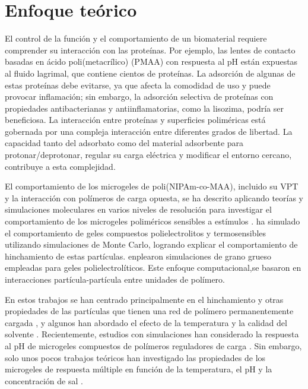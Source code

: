 \section{Enfoque te\'orico}


El control de la funci\'on y el comportamiento de un biomaterial requiere comprender su interacci\'on con las prote\'inas. Por ejemplo, las lentes de contacto basadas en \'acido poli(metacr\'ilico) (PMAA) con respuesta al pH est\'an expuestas al fluido lagrimal, que contiene cientos de prote\'inas. La adsorci\'on de algunas de estas prote\'inas debe evitarse, ya que afecta la comodidad de uso y puede provocar inflamaci\'on; sin embargo, la adsorci\'on selectiva de prote\'inas con propiedades antibacterianas y antiinflamatorias, como la lisozima, podr\'ia ser beneficiosa. 
La interacci\'on entre prote\'inas y superficies polim\'ericas est\'a gobernada por una compleja interacci\'on entre diferentes grados de libertad. La capacidad tanto del adsorbato como del material adsorbente para protonar/deprotonar, regular su carga el\'ectrica y modificar el entorno cercano, contribuye a esta complejidad.


El comportamiento de los microgeles de poli(NIPAm-co-MAA), incluido su VPT y la interacci\'on con pol\'imeros de carga opuesta, se ha descrito aplicando teor\'ias  y simulaciones moleculares en varios niveles de resoluci\'on para investigar el comportamiento de los microgeles polim\'ericos sensibles a est\'imulos \cite{ahualli2016coarse,Landsgesell2019SM}.
\citet{quesada2011gel} ha simulado el comportamiento de geles compuestos  polielectrolitos y termosensibles utilizando  simulaciones de Monte Carlo, logrando explicar el comportamiento de hinchamiento de estas part\'iculas.
\citet{ahualli2016coarse}
enplearon simulaciones de grano grueso empleadas para geles polielectrol\'iticos. Este enfoque computacional,se basaron en interacciones part\'icula-partícula entre unidades de pol\'imero. 

En estos trabajos se han centrado principalmente en el hinchamiento y otras propiedades de las part\'iculas que tienen una red de pol\'imero permanentemente cargada , y algunos han abordado el efecto de la temperatura y la calidad del solvente \cite{Jha2011, QuesadaPerez2013, moncho-jorda2016a, ahualli2016coarse, AdroherBenitez2017PCCP}.
Recientemente, estudios  con simulaciones han considerado la respuesta al pH de microgeles compuestos de pol\'imeros reguladores de carga \cite{Schroeder2015,Rud2017,Sean2018, Hofzumahaus2018,Lu2019}.
Sin embargo, solo unos pocos trabajos te\'oricos han investigado las propiedades de los microgeles de respuesta m\'ultiple en funci\'on de la temperatura, el pH y la concentración de sal  \cite{CaprilesGonzalez2008,polotsky2013collapse}.

